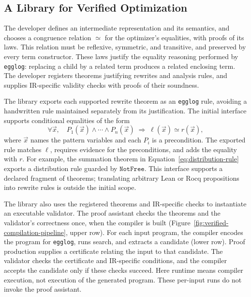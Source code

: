\subsection{A Library for Verified Optimization}
\label{sec:verified-compilation}
\label{sec:lean}

The developer defines an intermediate representation and its semantics,
  and chooses a congruence relation $\simeq$ for the optimizer's equalities,
  with proofs of its laws.
This relation must be reflexive, symmetric, and transitive,
  and preserved by every term constructor.
These laws justify the equality reasoning performed by \texttt{egglog}:
  replacing a child by a related term produces a related enclosing term.
The developer registers theorems justifying rewrites and analysis rules,
  and supplies IR-specific validity checks with proofs of their soundness.

The library exports each supported rewrite theorem as an \texttt{egglog} rule,
  avoiding a handwritten rule maintained separately from its justification.
The initial interface supports conditional equalities of the form
\[
  \forall\vec{x},\quad
  P_1(\vec{x})\land\cdots\land P_n(\vec{x})
  \;\Longrightarrow\;
  \ell(\vec{x})\simeq r(\vec{x}),
\]
where $\vec{x}$ names the pattern variables and each $P_i$ is a precondition.
The exported rule matches $\ell$, requires evidence for the preconditions,
  and adds the equality with $r$.
For example, the summation theorem in Equation~\ref{eq:distribution-rule}
  exports a distribution rule guarded by $\mathtt{NotFree}$.
This interface supports a declared fragment of theorems;
  translating arbitrary Lean or Rocq propositions into rewrite rules is outside the initial scope.

The library also uses the registered theorems and IR-specific checks to instantiate an executable validator.
The proof assistant checks the theorems and the validator's correctness once,
  when the compiler is built (Figure~\ref{fig:verified-compilation-pipeline}, upper row).
For each input program, the compiler encodes the program for \texttt{egglog},
  runs search, and extracts a candidate (lower row).
Proof production supplies a certificate relating the input to that candidate.
The validator checks the certificate and IR-specific conditions,
  and the compiler accepts the candidate only if these checks succeed.
Here runtime means compiler execution, not execution of the generated program.
These per-input runs do not invoke the proof assistant.

